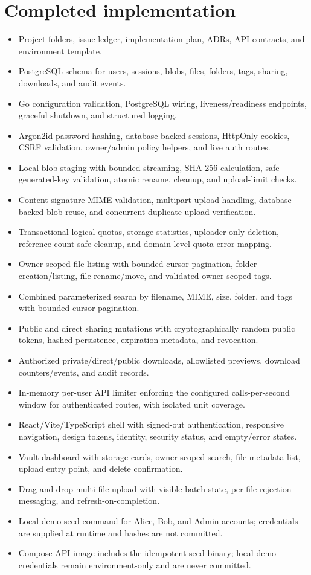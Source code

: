 \documentclass[11pt,a4paper]{article}
\begin{document}
\section{Completed implementation}
\begin{itemize}[leftmargin=*]
  \item Project folders, issue ledger, implementation plan, ADRs, API contracts, and environment template.
  \item PostgreSQL schema for users, sessions, blobs, files, folders, tags, sharing, downloads, and audit events.
  \item Go configuration validation, PostgreSQL wiring, liveness/readiness endpoints, graceful shutdown, and structured logging.
  \item Argon2id password hashing, database-backed sessions, HttpOnly cookies, CSRF validation, owner/admin policy helpers, and live auth routes.
  \item Local blob staging with bounded streaming, SHA-256 calculation, safe generated-key validation, atomic rename, cleanup, and upload-limit checks.
  \item Content-signature MIME validation, multipart upload handling, database-backed blob reuse, and concurrent duplicate-upload verification.
  \item Transactional logical quotas, storage statistics, uploader-only deletion, reference-count-safe cleanup, and domain-level quota error mapping.
  \item Owner-scoped file listing with bounded cursor pagination, folder creation/listing, file rename/move, and validated owner-scoped tags.
  \item Combined parameterized search by filename, MIME, size, folder, and tags with bounded cursor pagination.
  \item Public and direct sharing mutations with cryptographically random public tokens, hashed persistence, expiration metadata, and revocation.
  \item Authorized private/direct/public downloads, allowlisted previews, download counters/events, and audit records.
  \item In-memory per-user API limiter enforcing the configured calls-per-second window for authenticated routes, with isolated unit coverage.
  \item React/Vite/TypeScript shell with signed-out authentication, responsive navigation, design tokens, identity, security status, and empty/error states.
  \item Vault dashboard with storage cards, owner-scoped search, file metadata list, upload entry point, and delete confirmation.
  \item Drag-and-drop multi-file upload with visible batch state, per-file rejection messaging, and refresh-on-completion.
  \item Local demo seed command for Alice, Bob, and Admin accounts; credentials are supplied at runtime and hashes are not committed.
  \item Compose API image includes the idempotent seed binary; local demo credentials remain environment-only and are never committed.
\end{itemize}
\end{document}
